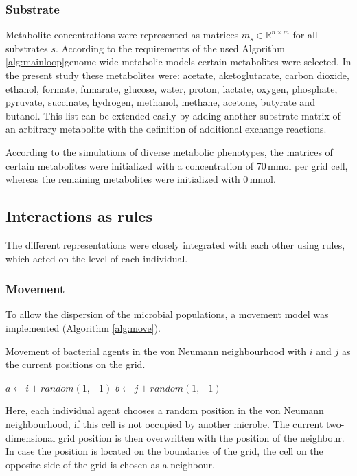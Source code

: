 \subsubsection{Substrate}
Metabolite concentrations were represented as matrices $m_s \in \mathbb{R}^{n \times m}$ for all substrates $s$. According to the requirements of the used Algorithm \hyperref[alg:mainloop]{\ref{alg:mainloop}}genome-wide metabolic models certain metabolites were selected. In the present study these metabolites were: acetate, aketoglutarate, carbon dioxide, ethanol, formate, fumarate, glucose, water, proton, lactate, oxygen, phosphate, pyruvate, succinate, hydrogen, methanol, methane, acetone, butyrate and butanol.
This list can be extended easily by adding another substrate matrix of an arbitrary metabolite with the definition of additional exchange reactions.

According to the simulations of diverse metabolic phenotypes, the matrices of certain metabolites were initialized with a concentration of 70\,mmol per grid cell, whereas the remaining metabolites were initialized with 0\,mmol. 

\subsection{Interactions as rules}
The different representations were closely integrated with each other using rules, which acted on the level of each individual.

\subsubsection{Movement}
To allow the dispersion of the microbial populations, a movement model was implemented (Algorithm \hyperref[alg:move]{\ref{alg:move}}). 
\begin{algorithm}
\caption{Movement of bacterial agents in the von Neumann neighbourhood with $i$ and $j$ as the current positions on the grid.}
\SetAlgoLined
$a \leftarrow i+random(1,-1)$\;
$b \leftarrow j+random(1,-1)$\;
\label{alg:move}
\end{algorithm}
Here, each individual agent chooses a random position in the von Neumann neighbourhood, if this cell is not occupied by another microbe. The current two-dimensional grid position is then overwritten with the position of the neighbour. In case the position is located on the boundaries of the grid, the cell on the opposite side of the grid is chosen as a neighbour.
